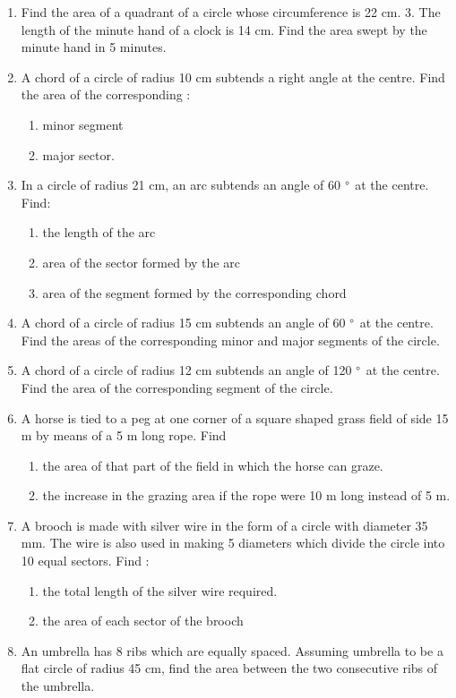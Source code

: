 \begin{enumerate}[label=\arabic*.,ref=\thesubsection.\theenumi]
\item Find the area of a quadrant of a circle whose circumference is 22 cm. 3. The length of the minute hand of a clock is 14 cm. Find the area swept by the minute hand in 5 minutes.
\item A chord of a circle of radius 10 cm subtends a right angle at the centre. Find the area of the corresponding : 
\begin{enumerate}
\item minor segment 
\item major sector.
\end{enumerate}

\item In a circle of radius 21 cm, an arc subtends an angle of 60 $\degree$  at the centre. Find: 
\begin{enumerate}
\item the length of the arc 
\item area of the sector formed by the arc 
\item area of the segment formed by the corresponding chord
\end{enumerate}
\item A chord of a circle of radius 15 cm subtends an angle of 60 $\degree$  at the centre. Find the areas of the corresponding minor and major segments of the circle. 
\item A chord of a circle of radius 12 cm subtends an angle of 120 $\degree$  at the centre. Find the area of the corresponding segment of the circle. 
\item A horse is tied to a peg at one corner of a square shaped grass field of side 15 m by means of a 5 m long rope. Find 
\begin{enumerate}
\item the area of that part of the field in which the horse can graze.
\item the increase in the grazing area if the rope were 10 m long instead of 5 m.
\end{enumerate}
\item A brooch is made with silver wire in the form of a circle with diameter 35 mm. The wire is also used in making 5 diameters which divide the circle into 10 equal sectors. Find : 
\begin{enumerate}
\item the total length of the silver wire required. 
\item the area of each sector of the brooch
\end{enumerate}
\item An umbrella has 8 ribs which are equally spaced. Assuming umbrella to be a flat circle of radius 45 cm, find the area between the two consecutive ribs of the umbrella.

\end{enumerate}
